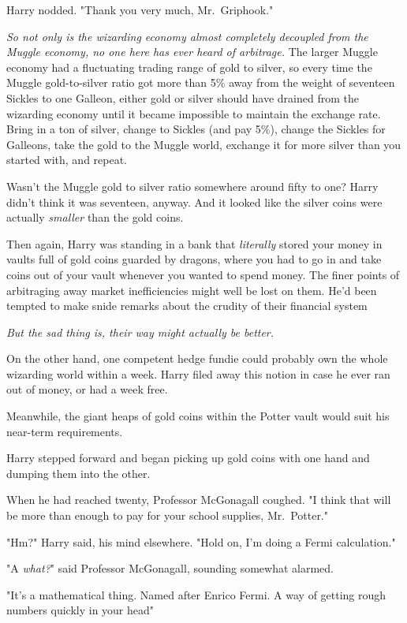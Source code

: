 Harry nodded. "Thank you very much, Mr.~Griphook."

\emph{So not only is the wizarding economy almost completely decoupled from the
Muggle economy, no one here has ever heard of arbitrage.} The larger Muggle
economy had a fluctuating trading range of gold to silver, so every time the
Muggle gold-to-silver ratio got more than 5\% away from the weight of seventeen
Sickles to one Galleon, either gold or silver should have drained from the
wizarding economy until it became impossible to maintain the exchange rate.
Bring in a ton of silver, change to Sickles (and pay 5\%), change the Sickles
for Galleons, take the gold to the Muggle world, exchange it for more silver
than you started with, and repeat.

Wasn't the Muggle gold to silver ratio somewhere around fifty to one? Harry
didn't think it was seventeen, anyway. And it looked like the silver coins were
actually \emph{smaller} than the gold coins.

Then again, Harry was standing in a bank that \emph{literally} stored your
money in vaults full of gold coins guarded by dragons, where you had to go in
and take coins out of your vault whenever you wanted to spend money. The finer
points of arbitraging away market inefficiencies might well be lost on them.
He'd been tempted to make snide remarks about the crudity of their financial
system{\el}

\emph{But the sad thing is, their way might actually be better.}

On the other hand, one competent hedge fundie could probably own the whole
wizarding world within a week. Harry filed away this notion in case he ever ran
out of money, or had a week free.

Meanwhile, the giant heaps of gold coins within the Potter vault would suit
his near-term requirements.

Harry stepped forward and began picking up gold coins with one hand and
dumping them into the other.

When he had reached twenty, Professor McGonagall coughed. "I think that will be
more than enough to pay for your school supplies, Mr.~Potter."

"Hm?" Harry said, his mind elsewhere. "Hold on, I'm doing a Fermi calculation."

"A \emph{what?}" said Professor McGonagall, sounding somewhat alarmed.

"It's a mathematical thing. Named after Enrico Fermi. A way of getting rough
numbers quickly in your head{\el}"

